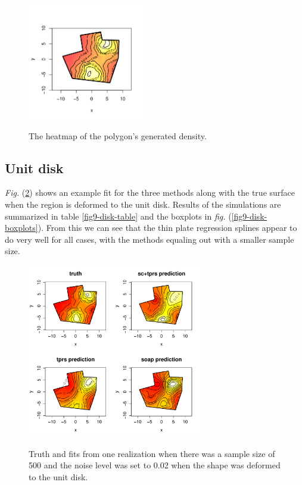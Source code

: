 \documentclass[a4paper,10pt]{amsart}
\newcommand{\fig}[1]{\emph{fig.} (\ref{#1})}
\newcommand{\Fig}[1]{\emph{Fig.} (\ref{#1})}
\begin{document}
\begin{figure}
\centering
\includegraphics[width=2in]{figs-otherdomains/fig9.png} \\
\caption{The heatmap of the polygon's generated density.}
\label{fig9}
\end{figure}

\subsection{Unit disk}

\Fig{fig9-disk-real} shows an example fit for the three methods along with the true surface when the region is deformed to the unit disk. Results of the simulations are summarized in table \ref{fig9-disk-table} and the boxplots in \fig{fig9-disk-boxplots}. From this we can see that the thin plate regression splines appear to do very well for all cases, with the methods equaling out with a smaller sample size.

\begin{figure}
\centering
\includegraphics[width=3in]{figs-otherdomains/fig9-disk-real.pdf} \\
\caption{Truth and fits from one realization when there was a sample size of 500 and the noise level was set to 0.02 when the shape was deformed to the unit disk. }
\label{fig9-disk-real}
\end{figure}
\end{document}
